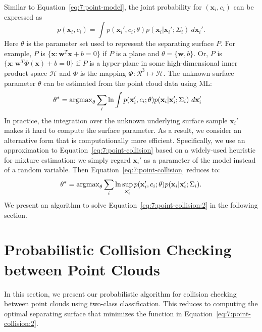 Similar to Equation~\ref{eq:7:point-model}, the joint probability for $(\mathbf x_i, c_i)$ can be expressed as
\begin{equation}
p(\mathbf x_i, c_i) = \int p(\mathbf x_i', c_i; \theta) p(\mathbf x_i|\mathbf x_i'; \Sigma_i) \ d\mathbf x_i'.
\end{equation}
Here $\theta$ is the parameter set used to represent the separating surface $P$. For example, $P$ is $\{\mathbf x: \mathbf w^T \mathbf x + b = 0\}$ if $P$ is a plane and $\theta = \{\mathbf w, b\}$. Or, $P$ is $\{\mathbf x: \mathbf w^T \Phi(\mathbf x) + b = 0\}$ if $P$ is a hyper-plane in some high-dimensional inner product space $\mathcal H$ and $\Phi$ is the mapping $\Phi: \mathcal R^3 \mapsto \mathcal H$. The unknown surface parameter $\theta$ can be estimated from the point cloud data using ML:
\begin{equation}
\begin{aligned}
\label{eq:7:point-collision}
\theta^*
&= \operatorname{argmax}_{\theta} \sum_i \ln \int p(\mathbf x_i', c_i; \theta) p(\mathbf x_i|\mathbf x_i'; \Sigma_i) \ d\mathbf x_i'
\end{aligned}
\end{equation}
In practice, the integration over the unknown underlying surface sample $\mathbf x_i'$ makes it hard to compute the surface parameter. As a result,
we consider an alternative form that is computationally more efficient. Specifically, we use an approximation to Equation~\ref{eq:7:point-collision}
based on a widely-used heuristic for mixture estimation: we simply regard $\mathbf x_i'$ as a parameter of the model instead of a random variable. Then Equation~\ref{eq:7:point-collision} reduces to:
\begin{equation}
\label{eq:7:point-collision:2}
\theta^* = \operatorname{argmax}_{\theta} \sum_i \ln \sup_{\mathbf x_i'} p(\mathbf x_i', c_i; \theta) p(\mathbf x_i|\mathbf x_i'; \Sigma_i).
\end{equation}
We present an algorithm to solve Equation~\ref{eq:7:point-collision:2} in the following section.


\section{Probabilistic Collision Checking between Point Clouds}
\label{sec:7:algorithm}
In this section, we present our probabilistic algorithm for collision checking between point clouds using two-class classification. This reduces to computing the optimal separating surface that minimizes the function in Equation~\ref{eq:7:point-collision:2}.


